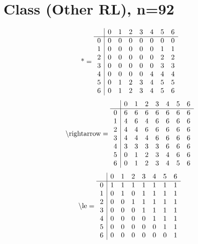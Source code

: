 \documentclass[11pt]{article}
\begin{document}
\section{Class (Other RL), n=92}
\[\text{*} = 
\begin{array}{r | r r r r r r r}
 & 0 & 1 & 2 & 3 & 4 & 5 & 6 \\ \hline
0 & 0 & 0 & 0 & 0 & 0 & 0 & 0 \\
1 & 0 & 0 & 0 & 0 & 0 & 1 & 1 \\
2 & 0 & 0 & 0 & 0 & 0 & 2 & 2 \\
3 & 0 & 0 & 0 & 0 & 0 & 3 & 3 \\
4 & 0 & 0 & 0 & 0 & 4 & 4 & 4 \\
5 & 0 & 1 & 2 & 3 & 4 & 5 & 5 \\
6 & 0 & 1 & 2 & 3 & 4 & 5 & 6 \\
\end{array}
\]
\[\text{\textbackslash rightarrow} = 
\begin{array}{r | r r r r r r r}
 & 0 & 1 & 2 & 3 & 4 & 5 & 6 \\ \hline
0 & 6 & 6 & 6 & 6 & 6 & 6 & 6 \\
1 & 4 & 6 & 4 & 6 & 6 & 6 & 6 \\
2 & 4 & 4 & 6 & 6 & 6 & 6 & 6 \\
3 & 4 & 4 & 4 & 6 & 6 & 6 & 6 \\
4 & 3 & 3 & 3 & 3 & 6 & 6 & 6 \\
5 & 0 & 1 & 2 & 3 & 4 & 6 & 6 \\
6 & 0 & 1 & 2 & 3 & 4 & 5 & 6 \\
\end{array}
\]
\[\text{\textbackslash le} = 
\begin{array}{r | r r r r r r r}
 & 0 & 1 & 2 & 3 & 4 & 5 & 6 \\ \hline
0 & 1 & 1 & 1 & 1 & 1 & 1 & 1 \\
1 & 0 & 1 & 0 & 1 & 1 & 1 & 1 \\
2 & 0 & 0 & 1 & 1 & 1 & 1 & 1 \\
3 & 0 & 0 & 0 & 1 & 1 & 1 & 1 \\
4 & 0 & 0 & 0 & 0 & 1 & 1 & 1 \\
5 & 0 & 0 & 0 & 0 & 0 & 1 & 1 \\
6 & 0 & 0 & 0 & 0 & 0 & 0 & 1 \\
\end{array}
\]
\end{document}
